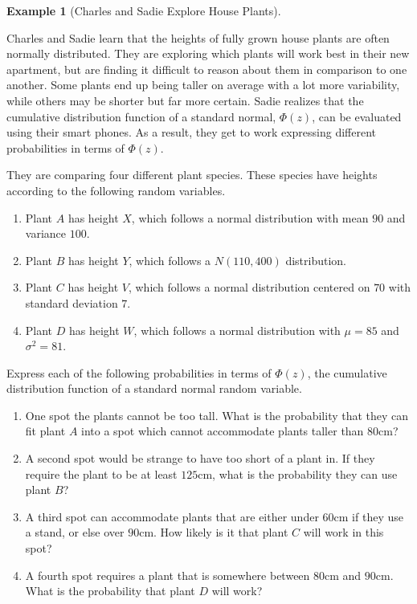 \documentclass[
  letterpaper,
  DIV=11,
  numbers=noendperiod]{scrreprt}
\providecommand{\tightlist}{%
  \setlength{\itemsep}{0pt}\setlength{\parskip}{0pt}}\usepackage{longtable,booktabs,array}
\theoremstyle{definition}
\theoremstyle{definition}
\newtheorem{example}{Example}[chapter]
\theoremstyle{definition}
\theoremstyle{remark}
\begin{document}
\begin{example}[Charles and Sadie Explore House
Plants]\protect\hypertarget{exm-standardization-example}{}\label{exm-standardization-example}

Charles and Sadie learn that the heights of fully grown house plants are
often normally distributed. They are exploring which plants will work
best in their new apartment, but are finding it difficult to reason
about them in comparison to one another. Some plants end up being taller
on average with a lot more variability, while others may be shorter but
far more certain. Sadie realizes that the cumulative distribution
function of a standard normal, \(\Phi(z)\), can be evaluated using their
smart phones. As a result, they get to work expressing different
probabilities in terms of \(\Phi(z)\).

They are comparing four different plant species. These species have
heights according to the following random variables.

\begin{enumerate}
\def\labelenumi{\roman{enumi}.}
\tightlist
\item
  Plant \(A\) has height \(X\), which follows a normal distribution with
  mean \(90\) and variance \(100\).
\item
  Plant \(B\) has height \(Y\), which follows a \(N(110, 400)\)
  distribution.
\item
  Plant \(C\) has height \(V\), which follows a normal distribution
  centered on \(70\) with standard deviation \(7\).
\item
  Plant \(D\) has height \(W\), which follows a normal distribution with
  \(\mu=85\) and \(\sigma^2 = 81\).
\end{enumerate}

Express each of the following probabilities in terms of \(\Phi(z)\), the
cumulative distribution function of a standard normal random variable.

\begin{enumerate}
\def\labelenumi{\alph{enumi}.}
\tightlist
\item
  One spot the plants cannot be too tall. What is the probability that
  they can fit plant \(A\) into a spot which cannot accommodate plants
  taller than \(80\)cm?
\item
  A second spot would be strange to have too short of a plant in. If
  they require the plant to be at least \(125\)cm, what is the
  probability they can use plant \(B\)?
\item
  A third spot can accommodate plants that are either under \(60\)cm if
  they use a stand, or else over \(90\)cm. How likely is it that plant
  \(C\) will work in this spot?
\item
  A fourth spot requires a plant that is somewhere between \(80\)cm and
  \(90\)cm. What is the probability that plant \(D\) will work?
\end{enumerate}


\end{example}
\end{document}
